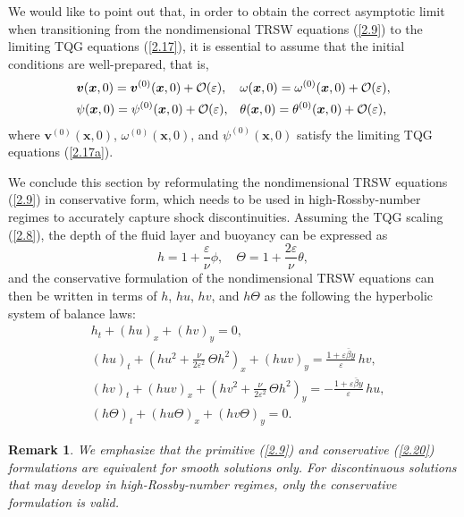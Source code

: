 \documentclass[a4paper,11pt,twoside]{article}
\newtheorem{rmk}{Remark}[section]
\numberwithin{equation}{section}
\numberwithin{figure}{section}
\numberwithin{table}{section}
\newcommand{\eps}{\varepsilon}
\newcommand{\bx}{\bm{x}}
\newcommand{\bv}{\bm{v}}
\newcommand\eref[1]{(\ref{#1})}
\begin{document}
We would like to point out that, in order to obtain the correct asymptotic limit when transitioning from the nondimensional TRSW equations 
\eref{2.9} to the limiting TQG equations \eref{2.17}, it is essential to assume that the initial conditions are well-prepared, that is,
\begin{equation}
\begin{aligned}
&\bv(\bx,0)=\bv^{(0)}(\bx,0)+{\cal O}(\eps),&&\omega(\bx,0)=\omega^{(0)}(\bx,0)+{\cal O}(\eps),\\
&\psi(\bx,0)=\psi^{(0)}(\bx,0)+{\cal O}(\eps),&&\theta(\bx,0)=\theta^{(0)}(\bx,0)+{\cal O}(\eps),
\end{aligned}
\label{2.18}
\end{equation}
where $\bv^{(0)}(\bx,0)$, $\omega^{(0)}(\bx,0)$, and $\psi^{(0)}(\bx,0)$ satisfy the limiting TQG equations \eref{2.17a}.  

We conclude this section by reformulating the nondimensional TRSW equations \eref{2.9} in conservative form, which needs to be used in 
high-Rossby-number regimes to accurately capture shock discontinuities. Assuming the TQG scaling \eref{2.8}, the depth of the fluid layer
and buoyancy can be expressed as
\begin{equation}
h=1+\frac{\eps}{\nu}\phi,\quad\Theta=1+\frac{2\eps}{\nu}\theta,
\label{2.19}
\end{equation}
and the conservative formulation of the nondimensional TRSW equations can then be written in terms of $h$, $hu$, $hv$, and $h\Theta$ as the 
following the hyperbolic system of balance laws:
\begin{equation}
\begin{aligned}
&h_t+(hu)_x+(hv)_y=0,\\
&(hu)_t+\left(hu^2+\frac{\nu}{2\eps^2}\,\Theta h^2\right)_x+(huv)_y=\frac{1+\eps\bar\beta y}{\eps}\,hv,\\
&(hv)_t+(huv)_x+\left(hv^2+\frac{\nu}{2\eps^2}\,\Theta h^2\right)_y=-\frac{1+\eps\bar\beta y}{\eps}\,hu,\\
&(h\Theta)_t+(hu\Theta)_x+(hv\Theta)_y=0.
\end{aligned}
\label{2.20}
\end{equation}
\begin{rmk}
We emphasize that the primitive \eref{2.9} and conservative \eref{2.20} formulations are equivalent for smooth solutions only. For 
discontinuous solutions that may develop in high-Rossby-number regimes, only the conservative formulation is valid.
\end{rmk}
\end{document}
